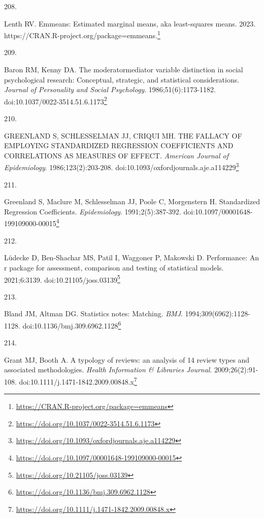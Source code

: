 \documentclass[
  a4paper,
]{book}
\newlength{\cslhangindent}
\newlength{\csllabelwidth}
\newlength{\cslentryspacingunit} %
\newenvironment{CSLReferences}[2] %
 {%
  \setlength{\parindent}{0pt}
  \ifodd #1
  \let\oldpar\par
  \def\par{\hangindent=\cslhangindent\oldpar}
  \fi
  \setlength{\parskip}{#2\cslentryspacingunit}
 }%
 {}
\newcommand{\CSLLeftMargin}[1]{\parbox[t]{\csllabelwidth}{#1}}
\newcommand{\CSLRightInline}[1]{\parbox[t]{\linewidth - \csllabelwidth}{#1}\break}
\renewcommand{\href}[2]{#2\footnote{\url{#1}}}
\begin{document}
\begin{CSLReferences}{0}{0}
\leavevmode{}%
\CSLLeftMargin{208. }%
\CSLRightInline{Lenth RV. Emmeans: Estimated marginal means, aka least-squares means. 2023. \href{https://CRAN.R-project.org/package=emmeans}{https://CRAN.R-project.org/package=emmeans.}}

\leavevmode{}%
\CSLLeftMargin{209. }%
\CSLRightInline{Baron RM, Kenny DA. The moderator{\textendash}mediator variable distinction in social psychological research: Conceptual, strategic, and statistical considerations. \emph{Journal of Personality and Social Psychology}. 1986;51(6):1173-1182. doi:\href{https://doi.org/10.1037/0022-3514.51.6.1173}{10.1037/0022-3514.51.6.1173}}

\leavevmode{}%
\CSLLeftMargin{210. }%
\CSLRightInline{GREENLAND S, SCHLESSELMAN JJ, CRIQUI MH. THE FALLACY OF EMPLOYING STANDARDIZED REGRESSION COEFFICIENTS AND CORRELATIONS AS MEASURES OF EFFECT. \emph{American Journal of Epidemiology}. 1986;123(2):203-208. doi:\href{https://doi.org/10.1093/oxfordjournals.aje.a114229}{10.1093/oxfordjournals.aje.a114229}}

\leavevmode{}%
\CSLLeftMargin{211. }%
\CSLRightInline{Greenland S, Maclure M, Schlesselman JJ, Poole C, Morgenstern H. Standardized Regression Coefficients. \emph{Epidemiology}. 1991;2(5):387-392. doi:\href{https://doi.org/10.1097/00001648-199109000-00015}{10.1097/00001648-199109000-00015}}

\leavevmode{}%
\CSLLeftMargin{212. }%
\CSLRightInline{Lüdecke D, Ben-Shachar MS, Patil I, Waggoner P, Makowski D. {\textbraceleft}Performance{\textbraceright}: An {\textbraceleft}r{\textbraceright} package for assessment, comparison and testing of statistical models. 2021;6:3139. doi:\href{https://doi.org/10.21105/joss.03139}{10.21105/joss.03139}}

\leavevmode{}%
\CSLLeftMargin{213. }%
\CSLRightInline{Bland JM, Altman DG. Statistics notes: Matching. \emph{BMJ}. 1994;309(6962):1128-1128. doi:\href{https://doi.org/10.1136/bmj.309.6962.1128}{10.1136/bmj.309.6962.1128}}

\leavevmode{}%
\CSLLeftMargin{214. }%
\CSLRightInline{Grant MJ, Booth A. A typology of reviews: an analysis of 14 review types and associated methodologies. \emph{Health Information \& Libraries Journal}. 2009;26(2):91-108. doi:\href{https://doi.org/10.1111/j.1471-1842.2009.00848.x}{10.1111/j.1471-1842.2009.00848.x}}


\end{CSLReferences}
\end{document}
